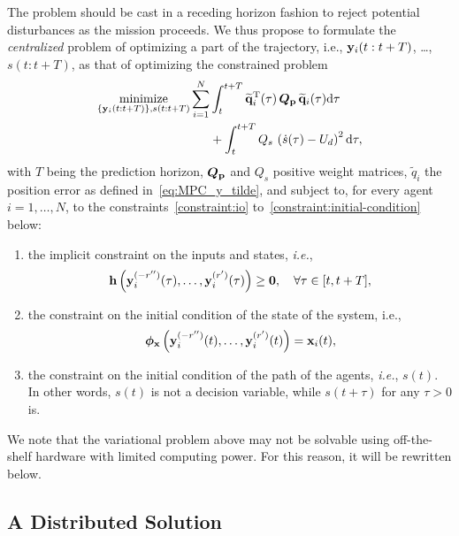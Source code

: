 The problem should be cast in a receding horizon fashion to reject potential disturbances as the mission proceeds.     
We thus propose to formulate the \emph{centralized} problem of optimizing a part of the trajectory, i.e., $\mathbf{y}_i(t:t+T)$, \ldots, $s(t:t+T)$, as that of optimizing the constrained problem
%
\begin{equation}
    \begin{split}
        \operatorname*{minimize}_{ \left\lbrace \mathbf{y}_i(t:t+T) \right\rbrace, s(t:t+T)}
        \sum_{i=1}^N
        &
        \int_{t}^{t+T}
        \widetilde{\mathbf{q}}_i^{\mathrm{T}}(\tau) \, \bm{Q}_{\mathbf{p}} \, \widetilde{\mathbf{q}}_i(\tau) {\rm d}\tau \\
        & 
        +
        \int_{t}^{t+T} Q_s\,\left(\dot{s}(\tau) - U_d\right)^2 {\rm d}\tau, 
    \end{split}
\label{eq:MPC_optimization_centralized}
\end{equation}
with $T$ being the prediction horizon, $\bm{Q}_{\mathbf{p}}$ and $Q_s$ positive weight matrices, $\widetilde{q}_{i}$ the position error as defined in~\eqref{eq:MPC_y_tilde}, and subject to, for every agent $i = 1, \ldots, N$, to the constraints~\ref{constraint:io} to~\ref{constraint:initial-condition} below:
\begin{enumerate}[label=C\arabic*]
    \item the implicit constraint on the inputs and states, \emph{i.e.}, $$\mathbf{h} \left( \mathbf{y}_i^{(-r'')}(\tau), \ldots, \mathbf{y}^{(r')}_i(\tau) \right) \geq \bm{0}, \quad \forall \tau \in [t, t + T],$$
    \label{constraint:io}
    \item the constraint on the initial condition of the state of the system, i.e., $$\bm{\phi}_{\mathbf{x}} \left(\mathbf{y}_i^{(-r'')}(t), \ldots, \mathbf{y}^{(r')}_i(t)\right) = \mathbf{x}_{i}(t),$$
    \item the constraint on the initial condition of the path of the agents, \emph{i.e.}, $s(t)$. In other words, $s(t)$ is not a decision variable, while $s(t+\tau)$ for any $\tau > 0$ is.
    \label{constraint:initial-condition}
\end{enumerate}
We note that the variational problem above may not be solvable using off-the-shelf hardware with limited computing power. For this reason, it will be rewritten below.



\subsection{A Distributed Solution}



